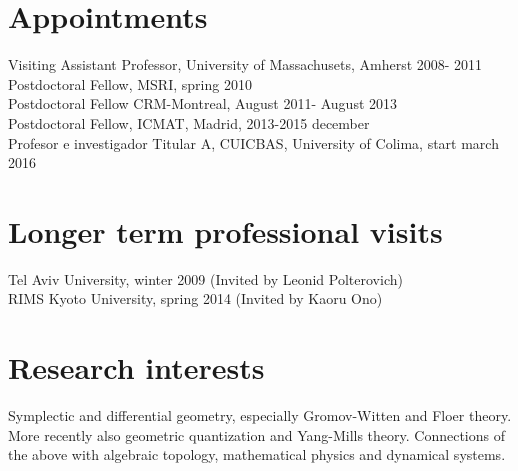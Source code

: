 \documentclass[overlapped,line,letterpaper]{res}
\begin{document}
\begin{resume}
\section {\sc Appointments}
Visiting Assistant Professor, University of Massachusets, Amherst 2008-
2011 \\ Postdoctoral Fellow, MSRI, spring 2010\\
Postdoctoral Fellow CRM-Montreal, August 2011- August 2013\\
Postdoctoral Fellow, ICMAT, Madrid, 2013-2015 december \\
Profesor e investigador Titular A, CUICBAS, University of Colima, start march 2016 \\
\section {\sc Longer term professional visits}
Tel Aviv University, winter 2009  (Invited by Leonid Polterovich) \\
RIMS Kyoto University, spring 2014 (Invited by Kaoru Ono) \\
\section{\sc Research interests} 
Symplectic and differential geometry, especially Gromov-Witten and
Floer theory. More recently also geometric quantization and Yang-Mills
theory. Connections of the above with algebraic topology, mathematical physics and dynamical
systems. 


\end{resume}
\end{document}
